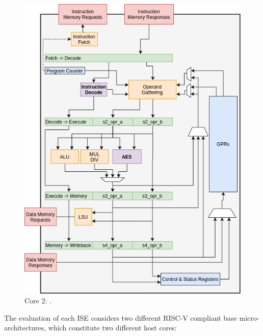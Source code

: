
\begin{figure}
\centering
\includegraphics[scale=0.45,angle=90]{diagrams/scarv-cpu-uarch.png}
\caption{Core $2$: .}
\label{fig:design:cpu_block:2}
\end{figure}


The evaluation of each ISE considers two different RISC-V compliant base
micro-architectures, which constitute two different host cores:

